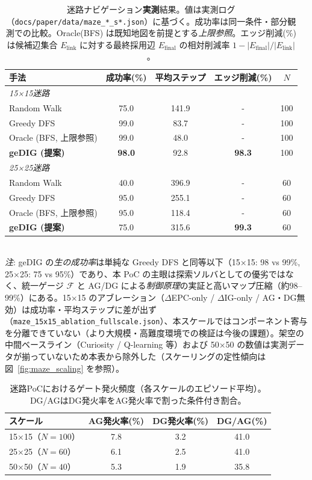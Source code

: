 \documentclass[ja=standard,xelatex]{bxjsarticle}
\newcommand{\F}{\mathcal{F}}
\newcommand{\experimNote}[1]{}
\begin{document}
\begin{table}[H]
\centering
\caption{迷路ナビゲーション\textbf{実測}結果。値は実測ログ（\texttt{docs/paper/data/maze\_*\_s*.json}）に基づく。成功率は同一条件・部分観測での比較。Oracle(BFS) は既知地図を前提とする\emph{上限参照}。エッジ削減(\%)は候補辺集合 $E_{\mathrm{link}}$ に対する最終採用辺 $E_{\mathrm{final}}$ の相対削減率 $1-\lvert E_{\mathrm{final}}\rvert/\lvert E_{\mathrm{link}}\rvert$。}
\label{tab:maze_results}
\begin{tabular}{lcccc}
\toprule
手法 & 成功率(\%) & 平均ステップ & エッジ削減(\%) & $N$ \\
\midrule
\multicolumn{5}{l}{\textit{15×15迷路}} \\
Random Walk & 75.0 & 141.9 & - & 100 \\
Greedy DFS & 99.0 & 83.7 & - & 100 \\
Oracle (BFS, 上限参照) & 99.0 & 48.0 & - & 100 \\
\textbf{geDIG (提案)} & \textbf{98.0} & 92.8 & \textbf{98.3} & 100 \\
\midrule
\multicolumn{5}{l}{\textit{25×25迷路}} \\
Random Walk & 40.0 & 396.9 & - & 60 \\
Greedy DFS & 95.0 & 255.1 & - & 60 \\
Oracle (BFS, 上限参照) & 95.0 & 118.4 & - & 60 \\
\textbf{geDIG (提案)} & 75.0 & 315.6 & \textbf{99.3} & 60 \\
\bottomrule
\end{tabular}
\\[0.4em]
\footnotesize\textit{注}: geDIG の\emph{生の成功率}は単純な Greedy DFS と同等以下（15×15: 98 vs 99\%, 25×25: 75 vs 95\%）であり、本 PoC の主眼は探索ソルバとしての優劣ではなく、統一ゲージ $\F$ と AG/DG による\emph{制御原理}の実証と高いマップ圧縮（約98--99\%）にある。15×15 のアブレーション（$\Delta$EPC-only / $\Delta$IG-only / AG・DG無効）は成功率・平均ステップに差が出ず（\texttt{maze\_15x15\_ablation\_fullscale.json}）、本スケールではコンポーネント寄与を分離できていない（より大規模・高難度環境での検証は今後の課題）。架空の中間ベースライン（Curiosity / Q-learning 等）および 50×50 の数値は実測データが揃っていないため本表から除外した（スケーリングの定性傾向は図~\ref{fig:maze_scaling} を参照）。
\end{table}

\experimNote{50×50の大規模実験は現在20エピソードのみ。追加40エピソードを実施予定}

\begin{table}[H]
\centering
\small
\caption{迷路PoCにおけるゲート発火頻度（各スケールのエピソード平均）。DG/AGはDG発火率をAG発火率で割った条件付き割合。}
\label{tab:maze_gate_stats}
\begin{tabular}{lccc}
\toprule
スケール & AG発火率(\%) & DG発火率(\%) & DG/AG(\%) \\
\midrule
15×15（$N{=}100$） & 7.8 & 3.2 & 41.0 \\
25×25（$N{=}60$） & 6.1 & 2.5 & 41.0 \\
50×50（$N{=}40$） & 5.3 & 1.9 & 35.8 \\
\bottomrule
\end{tabular}
\end{table}
\end{document}
